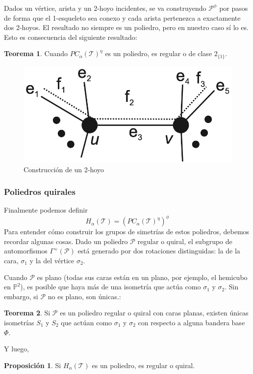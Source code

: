 \documentclass[spanish]{article}
\theoremstyle{definition}
\newtheorem*{teo}{Teorema}
\newtheorem*{prop}{Proposición}
\newcommand{\PP}{\mathbb{P}}
\newcommand{\p}{\mathcal{P}}
\newcommand{\T}{\mathcal{T}}
\begin{document}
Dados un vértice, arista y un 2-hoyo incidentes, se va construyendo $\p^\phi$ por pasos de forma que el 1-esqueleto sea conexo y cada arista pertenezca a exactamente dos 2-hoyos. El resultado no siempre es un poliedro, pero en nuestro caso sí lo es. Esto es consecuencia del siguiente resultado:

\begin{teo}
	Cuando $PC_\alpha(\T)^\eta$ es un poliedro, es regular o de clase $2_{\{1\}}$.
\end{teo}

\begin{figure}[H]
	\centering
	\includegraphics[width=0.5\linewidth]{p4}
	\caption*{Construcción de un 2-hoyo}
\end{figure}

\subsubsection{Poliedros quirales}
Finalmente podemos definir
\[H_\alpha(\T)=\left(PC_\alpha(\T)^\eta\right)^\phi\]
Para entender cómo construir los grupos de simetrías de estos poliedros, debemos recordar algunas cosas. Dado un poliedro $\p$ regular o quiral, el subgrupo de automorfismos $\Gamma^+(\p)$ está generado por dos rotaciones distinguidas: la de la cara, $\sigma_1$ y la del vértice $\sigma_2$.

Cuando $\p$ es plano (todas sus caras están en un plano, por ejemplo, el hemicubo en $\PP^2$), es posible que haya más de una isometría que actúa como $\sigma_1$ y $\sigma_2$.  Sin embargo, si $\p$ no es plano, son únicas.:
\begin{teo}
	Si $\p$ es un poliedro regular o quiral con caras planas, existen únicas isometrías $S_1$ y $S_2$ que actúan como $\sigma_1$ y $\sigma_2$ con respecto a alguna bandera base $\Phi$.
\end{teo}
Y luego,
\begin{prop}
	Si $H_\alpha(\T)$ es un poliedro, es regular o quiral.
\end{prop}
\end{document}

